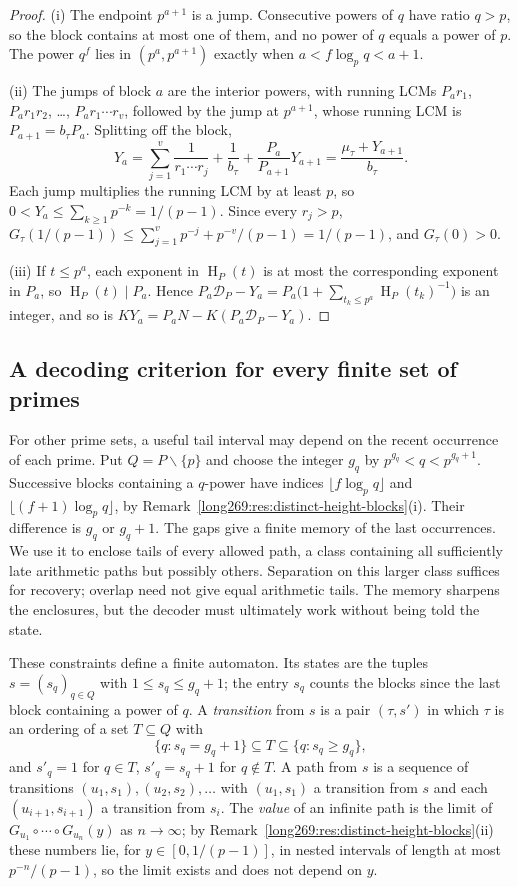 \documentclass[11pt]{article}
\theoremstyle{remark}
\theoremstyle{plain}
\newcommand{\hgt}{\operatorname{H}}
\begin{document}
\begin{proof}
(i) The endpoint $p^{a+1}$ is a jump.  Consecutive powers of $q$ have ratio
$q>p$, so the block contains at most one of them, and no power of $q$ equals
a power of $p$.  The power $q^f$ lies in $(p^a,p^{a+1})$ exactly when
$a<f\log_pq<a+1$.

(ii) The jumps of block $a$ are the interior powers, with running LCMs
$P_ar_1$, $P_ar_1r_2$, \ldots, $P_ar_1\cdots r_v$, followed by the jump at
$p^{a+1}$, whose running LCM is $P_{a+1}=b_\tau P_a$.  Splitting off the block,
\[
 Y_a=\sum_{j=1}^{v}\frac1{r_1\cdots r_j}+\frac1{b_\tau}
    +\frac{P_a}{P_{a+1}}Y_{a+1}=\frac{\mu_\tau+Y_{a+1}}{b_\tau}.
\]
Each jump multiplies the running LCM by at least $p$, so
$0<Y_a\le\sum_{k\ge1}p^{-k}=1/(p-1)$.  Since every $r_j>p$,
$G_\tau(1/(p-1))\le\sum_{j=1}^{v}p^{-j}+p^{-v}/(p-1)=1/(p-1)$, and
$G_\tau(0)>0$.

(iii) If $t\le p^a$, each exponent in $\hgt_P(t)$ is at most the
corresponding exponent in $P_a$, so $\hgt_P(t)\mid P_a$.  Hence
$P_a\mathcal D_P-Y_a=P_a\bigl(1+\sum_{t_k\le p^a}\hgt_P(t_k)^{-1}\bigr)$ is
an integer, and so is $KY_a=P_aN-K(P_a\mathcal D_P-Y_a)$.
\end{proof}

\subsection{A decoding criterion for every finite set of primes}
\label{long269:sec:distinct-criterion}
For other prime sets, a useful tail interval may depend on the recent
occurrence of each prime. Put $Q=P\smallsetminus\{p\}$ and choose the
integer $g_q$ by $p^{g_q}<q<p^{g_q+1}$. Successive blocks containing a
$q$-power have indices $\lfloor f\log_p q\rfloor$ and
$\lfloor(f+1)\log_p q\rfloor$, by
Remark~\ref{long269:res:distinct-height-blocks}(i). Their difference is
$g_q$ or $g_q+1$. The gaps give a finite memory of the last occurrences. We use it to
enclose tails of every allowed path, a class containing all sufficiently
late arithmetic paths but possibly others. Separation on this larger
class suffices for recovery; overlap need not give equal arithmetic tails.
The memory sharpens the enclosures, but the decoder must ultimately work
without being told the state.

These constraints define a finite automaton.  Its states are the tuples
$s=(s_q)_{q\in Q}$ with $1\le s_q\le g_q+1$; the entry $s_q$ counts the blocks
since the last block containing a power of $q$.  A \emph{transition} from $s$
is a pair $(\tau,s')$ in which $\tau$ is an ordering of a set $T\subseteq Q$
with
\[
 \{q:s_q=g_q+1\}\subseteq T\subseteq\{q:s_q\ge g_q\},
\]
and $s'_q=1$ for $q\in T$, $s'_q=s_q+1$ for $q\notin T$.  A path from $s$
is a sequence of transitions $(u_1,s_1),(u_2,s_2),\ldots$ with $(u_1,s_1)$ a
transition from $s$ and each $(u_{i+1},s_{i+1})$ a transition from $s_i$.
The \emph{value} of an infinite path is the limit of
$G_{u_1}\circ\cdots\circ G_{u_n}(y)$ as $n\to\infty$; by
Remark~\ref{long269:res:distinct-height-blocks}(ii) these numbers lie, for
$y\in[0,1/(p-1)]$, in nested intervals of length at most $p^{-n}/(p-1)$, so
the limit exists and does not depend on $y$.
\end{document}
